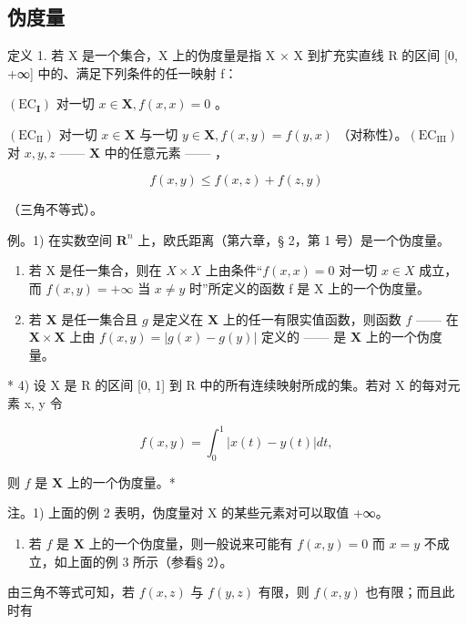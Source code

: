 \subsection{伪度量}

定义 1. 若 X 是一个集合，X 上的伪度量是指 X × X 到扩充实直线 R 的区间 {[}0, +∞{]} 中的、满足下列条件的任一映射 f：

\((\mathrm{EC}_{\mathbf{I}})\) 对一切 \(x \in \mathbf{X}, f(x, x) = 0\) 。

\((\mathrm{EC}_{\mathrm{II}})\) 对一切 \(x \in \mathbf{X}\) 与一切 \(y \in \mathbf{X}, f(x, y) = f(y, x)\) （对称性）。\((\mathrm{EC}_{\mathrm{III}})\) 对 \(x, y, z\) —— \(\mathbf{X}\) 中的任意元素 —— ，

\[
f (x, y) \leqslant f (x, z) + f (z, y)
\]

（三角不等式）。

例。1) 在实数空间 \(\mathbf{R}^n\) 上，欧氏距离（第六章，§ 2，第 1 号）是一个伪度量。

\begin{enumerate}
\def\labelenumi{\arabic{enumi})}
\setcounter{enumi}{1}
\item
  若 X 是任一集合，则在 \(X \times X\) 上由条件“\(f(x, x) = 0\) 对一切 \(x \in X\) 成立，而 \(f(x, y) = +\infty\) 当 \(x \neq y\) 时”所定义的函数 f 是 X 上的一个伪度量。
\item
  若 \(\mathbf{X}\) 是任一集合且 \(g\) 是定义在 \(\mathbf{X}\) 上的任一有限实值函数，则函数 \(f\) —— 在 \(\mathbf{X} \times \mathbf{X}\) 上由 \(f(x, y) = |g(x) - g(y)|\) 定义的 —— 是 \(\mathbf{X}\) 上的一个伪度量。
\end{enumerate}

* 4) 设 X 是 R 的区间 {[}0, 1{]} 到 R 中的所有连续映射所成的集。若对 X 的每对元素 x, y 令

\[
f (x, y) = \int_ {0} ^ {1} | x (t) - y (t) | d t,
\]

则 \(f\) 是 \(\mathbf{X}\) 上的一个伪度量。*

注。1) 上面的例 2 表明，伪度量对 X 的某些元素对可以取值 +∞。

\begin{enumerate}
\def\labelenumi{\arabic{enumi})}
\setcounter{enumi}{1}
\tightlist
\item
  若 \(f\) 是 \(\mathbf{X}\) 上的一个伪度量，则一般说来可能有 \(f(x, y) = 0\) 而 \(x = y\) 不成立，如上面的例 3 所示（参看§ 2）。
\end{enumerate}

由三角不等式可知，若 \(f(x, z)\) 与 \(f(y, z)\) 有限，则 \(f(x, y)\) 也有限；而且此时有

